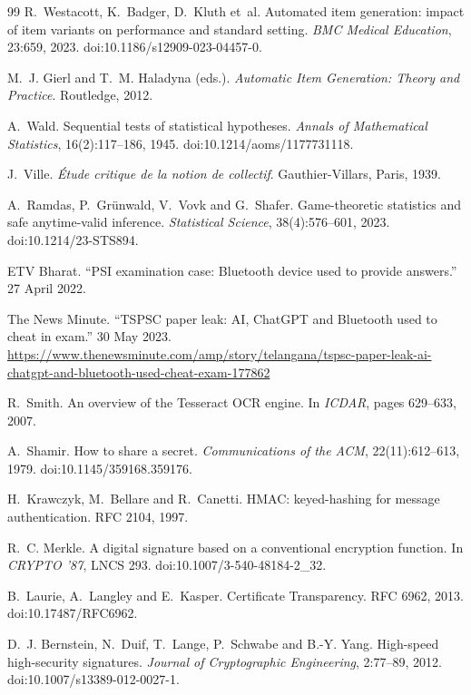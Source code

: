 \documentclass[10pt,a4paper]{article}
\theoremstyle{remark}
\begin{document}
\begin{thebibliography}{99}
 R.~Westacott, K.~Badger, D.~Kluth et~al. Automated item generation: impact of item variants on performance and standard setting. \emph{BMC Medical Education}, 23:659, 2023. doi:10.1186/s12909-023-04457-0.

 M.~J. Gierl and T.~M. Haladyna (eds.). \emph{Automatic Item Generation: Theory and Practice}. Routledge, 2012.

 A.~Wald. Sequential tests of statistical hypotheses. \emph{Annals of Mathematical Statistics}, 16(2):117--186, 1945. doi:10.1214/aoms/1177731118.

 J.~Ville. \emph{Étude critique de la notion de collectif}. Gauthier-Villars, Paris, 1939.

 A.~Ramdas, P.~Grünwald, V.~Vovk and G.~Shafer. Game-theoretic statistics and safe anytime-valid inference. \emph{Statistical Science}, 38(4):576--601, 2023. doi:10.1214/23-STS894.

 ETV Bharat. \enquote{PSI examination case: Bluetooth device used to provide answers.} 27 April 2022.

 The News Minute. \enquote{TSPSC paper leak: AI, ChatGPT and Bluetooth used to cheat in exam.} 30 May 2023. \url{https://www.thenewsminute.com/amp/story/telangana/tspsc-paper-leak-ai-chatgpt-and-bluetooth-used-cheat-exam-177862}

 R.~Smith. An overview of the Tesseract OCR engine. In \emph{ICDAR}, pages 629--633, 2007.

 A.~Shamir. How to share a secret. \emph{Communications of the ACM}, 22(11):612--613, 1979. doi:10.1145/359168.359176.

 H.~Krawczyk, M.~Bellare and R.~Canetti. HMAC: keyed-hashing for message authentication. RFC 2104, 1997.

 R.~C. Merkle. A digital signature based on a conventional encryption function. In \emph{CRYPTO '87}, LNCS 293. doi:10.1007/3-540-48184-2\_32.

 B.~Laurie, A.~Langley and E.~Kasper. Certificate Transparency. RFC 6962, 2013. doi:10.17487/RFC6962.

 D.~J. Bernstein, N.~Duif, T.~Lange, P.~Schwabe and B.-Y. Yang. High-speed high-security signatures. \emph{Journal of Cryptographic Engineering}, 2:77--89, 2012. doi:10.1007/s13389-012-0027-1.


\end{thebibliography}
\end{document}
